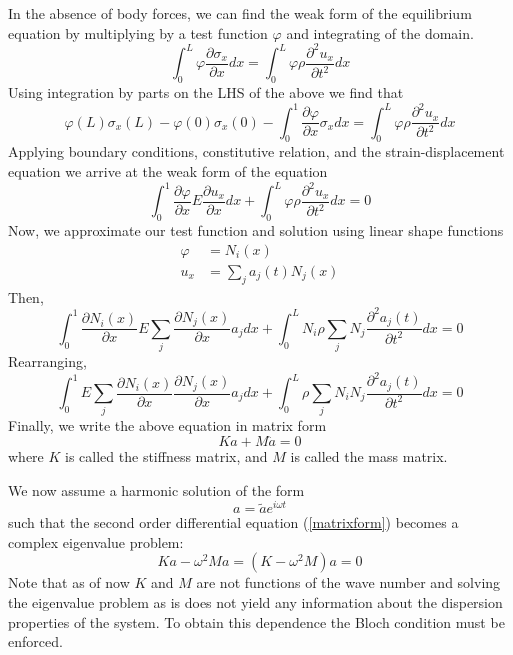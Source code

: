 \documentclass{article}
\begin{document}
In the absence of body forces, we can find the weak form of the equilibrium 
equation by multiplying by a test function $\varphi$ and integrating of the 
domain.
\begin{equation}
\int_0^L \varphi \frac{\partial \sigma_x}{\partial x} dx
= \int_0^L \varphi \rho \frac{\partial^2 u_x}{\partial t^2} dx
\end{equation}
Using integration by parts on the LHS of the above we find that
\begin{equation}
\varphi(L)\sigma_x(L) - \varphi(0)\sigma_x(0) 
- \int_0^1 \frac{\partial \varphi}{\partial x} \sigma_x dx
= \int_0^L \varphi \rho \frac{\partial^2 u_x}{\partial t^2} dx
\end{equation}
Applying boundary conditions, constitutive relation, and the 
strain-displacement equation we arrive at the weak form of the equation
\begin{equation}
\int_0^1 \frac{\partial \varphi}{\partial x} E \frac{\partial u_x}{\partial x} 
dx
+ \int_0^L \varphi \rho \frac{\partial^2 u_x}{\partial t^2} dx = 0
\end{equation}
Now, we approximate our test function and solution using linear shape functions
\begin{align}
\varphi &= N_i(x) \\
u_x &= \sum_j a_j(t)N_j(x)
\end{align}
Then,
\begin{equation}
\int_0^1 \frac{\partial N_i(x)}{\partial x} E \sum_j\frac{\partial 
N_j(x)}{\partial x} a_j dx
+ \int_0^L N_i \rho \sum_j N_j \frac{\partial^2 a_j(t)}{\partial t^2} dx = 0
\end{equation}
Rearranging,
\begin{equation}
\int_0^1  E \sum_j\frac{\partial N_i(x)}{\partial x}\frac{\partial 
N_j(x)}{\partial x} a_j dx
+ \int_0^L \rho \sum_j  N_i N_j \frac{\partial^2 a_j(t)}{\partial t^2} dx = 0
\end{equation}
Finally, we write the above equation in matrix form
\begin{equation} \label{matrixform}
Ka+M\ddot{a} = 0 
\end{equation}
where $K$ is called the stiffness matrix, and $M$ is called the mass matrix. 

We now assume a harmonic solution of the form
\begin{equation}
a = \tilde{a}e^{i \omega t}
\end{equation}
such that the second order differential equation (\ref{matrixform}) becomes a 
complex eigenvalue problem:
\begin{equation}
Ka - \omega^2 Ma = (K-\omega^2M)a = 0
\end{equation}
Note that as of now $K$ and $M$ are not functions of the wave number and 
solving the eigenvalue problem as is does not yield any information about the 
dispersion properties of the system. To obtain this dependence the Bloch 
condition must be enforced. 
\end{document}
